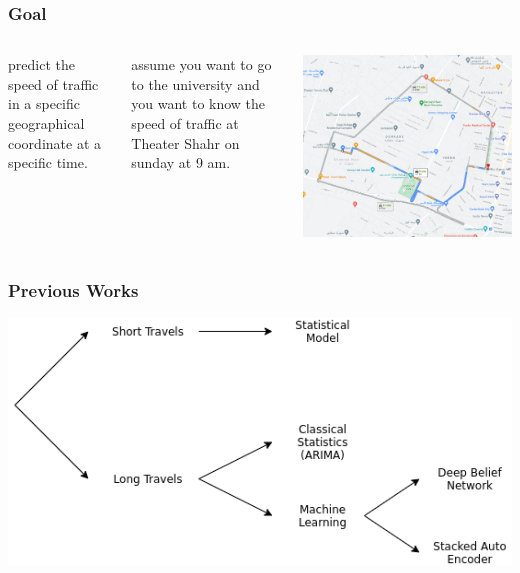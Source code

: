 \documentclass{beamer}
\begin{document}
\begin{frame}
  \frametitle{Goal}
  \begin{columns}
    \begin{definition}
      predict the speed of traffic in a specific geographical coordinate at a specific time.
    \end{definition}
    \pause
    \begin{example}
      assume you want to go to the university and you want to know the speed of traffic at Theater Shahr on sunday at 9 am.
    \end{example}
    \pause
    \includegraphics[height=0.5\textheight]{./img/intro.png}
  \end{columns}
\end{frame}
\begin{frame}
  \frametitle{Previous Works}
  \includegraphics[height=0.5\textheight]{./img/previous-works.png}
\end{frame}
\end{document}
